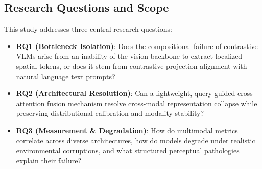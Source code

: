 \documentclass[conference]{IEEEtran}
\begin{document}
\subsection{Research Questions and Scope}
This study addresses three central research questions:
\begin{itemize}
    \item \textbf{RQ1 (Bottleneck Isolation)}: Does the compositional failure of contrastive VLMs arise from an inability of the vision backbone to extract localized spatial tokens, or does it stem from contrastive projection alignment with natural language text prompts?
    \item \textbf{RQ2 (Architectural Resolution)}: Can a lightweight, query-guided cross-attention fusion mechanism resolve cross-modal representation collapse while preserving distributional calibration and modality stability?
    \item \textbf{RQ3 (Measurement \& Degradation)}: How do multimodal metrics correlate across diverse architectures, how do models degrade under realistic environmental corruptions, and what structured perceptual pathologies explain their failure?
\end{itemize}
\end{document}
